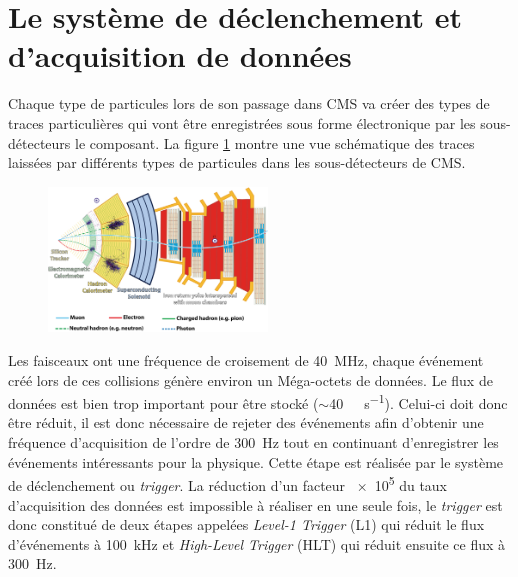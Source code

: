 \section{Le système de déclenchement et d'acquisition de données}
Chaque type de particules lors de son passage dans CMS va créer des types de traces particulières qui vont être enregistrées sous forme électronique par les sous-détecteurs le composant. La figure \ref{particules} montre une vue schématique des traces laissées par différents types de particules dans les sous-détecteurs de CMS.

	  \begin{figure}[ht!]
	\centering
	\includegraphics[width=0.52\textwidth]{CMS/particles.png}
	\label{particules}
\end{figure}

Les faisceaux ont une fréquence de croisement de \SI{40}{\mega\hertz}, chaque événement créé lors de ces collisions génère environ un Méga-octets de données. Le flux de données est bien trop important pour être stocké ($\sim$\SI{40}{\tera\byte\per\second}). Celui-ci doit donc être réduit, il est donc nécessaire de rejeter des événements afin d'obtenir une fréquence d'acquisition de l'ordre de \SI{300}{\hertz} tout en continuant d'enregistrer les événements intéressants pour la physique. Cette étape est réalisée par le système de déclenchement ou \textit{trigger}. La réduction d'un facteur \num{e5} du taux d'acquisition des données est impossible à réaliser en une seule fois, le \textit{trigger} est donc constitué de deux étapes appelées \textit{Level-1 Trigger} (L1) qui réduit le flux d'événements à \SI{100}{\kilo\hertz} et \textit{High-Level Trigger} (HLT) qui réduit ensuite ce flux à \SI{300}{\hertz}.

